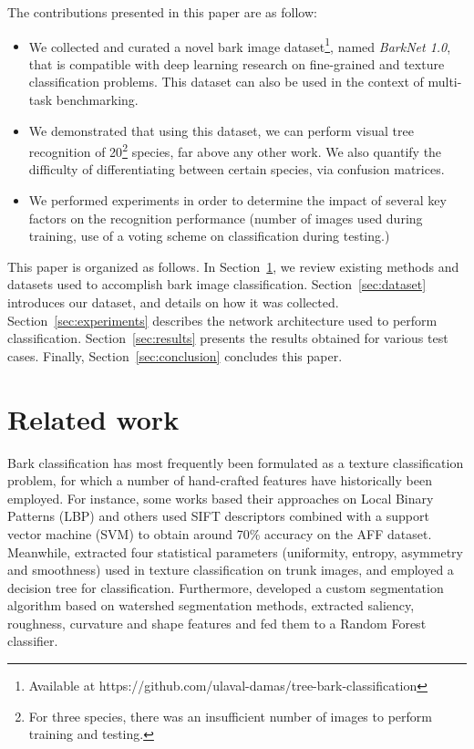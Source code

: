 \documentclass[letterpaper, 10 pt, conference]{ieeeconf}  %
\begin{document}
The contributions presented in this paper are as follow:
\begin{itemize}
\item We collected and curated a novel bark image dataset\footnote{Available at https://github.com/ulaval-damas/tree-bark-classification}, named \emph{BarkNet 1.0}, that is compatible with deep learning research on fine-grained and texture classification problems. This dataset can also be used in the context of multi-task benchmarking.
\item We demonstrated that using this dataset, we can perform visual tree recognition of 20\footnote{For three species, there was an insufficient number of images to perform training and testing.} species, far above any other work. We also quantify the difficulty of differentiating between certain species, via confusion matrices.
\item We performed experiments in order to determine the impact of several key factors on the recognition performance (number of images used during training, use of a voting scheme on classification during testing.)
\end{itemize}

This paper is organized as follows. In Section~\ref{sec:related_work}, we review existing methods and datasets used to accomplish bark image classification. Section~\ref{sec:dataset} introduces our dataset, and details on how it was collected. Section~\ref{sec:experiments} describes the network architecture used to perform classification. Section~\ref{sec:results} presents the results obtained for various test cases. Finally, Section~\ref{sec:conclusion} concludes this paper.

\section{Related work} \label{sec:related_work}

Bark classification has most frequently been formulated as a texture classification problem, for which a number of hand-crafted features have historically been employed. For instance, some works based their approaches on Local Binary Patterns (LBP) \cite{Boudra,SulcSupervisor2014,sulc2013kernel} and others \cite{Fiel} used SIFT descriptors combined with a support vector machine (SVM) to obtain around 70\% accuracy on the AFF dataset. Meanwhile, \cite{Bressane2015} extracted four statistical parameters (uniformity, entropy, asymmetry and smoothness) used in texture classification on trunk images, and employed a decision tree for classification. Furthermore, \cite{Othmani2016} developed a custom segmentation algorithm based on watershed segmentation methods, extracted saliency, roughness, curvature and shape features and fed them to a Random Forest classifier.
\end{document}
